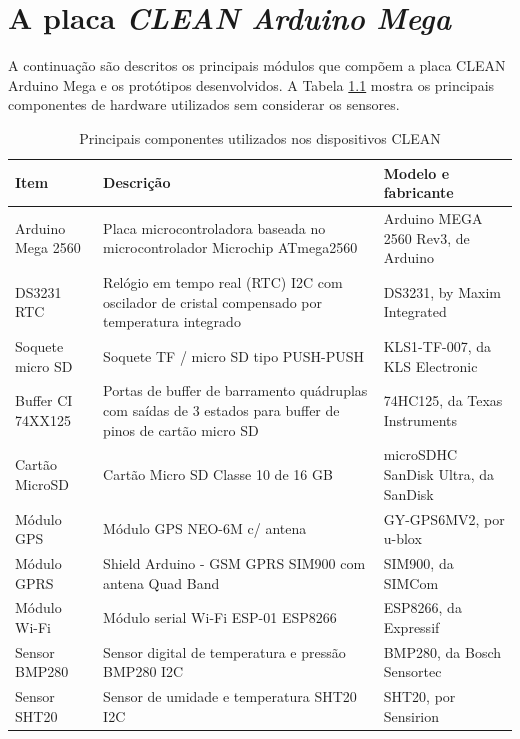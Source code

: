 \chapter{A placa \textit{CLEAN Arduino Mega}}\label{apendix: clean-arduino-mega-board}

A continuação são descritos os principais módulos que compõem a placa CLEAN Arduino Mega e os protótipos desenvolvidos. A Tabela \ref{tab:componentes-clean} mostra os principais componentes de hardware utilizados sem considerar os sensores.

\begin{table}
    \caption{Principais componentes utilizados nos dispositivos CLEAN}
    \label{tab:componentes-clean}
    \centering
    \begin{tabularx}{0.95\textwidth}[h]{
         >{\raggedright\arraybackslash}X
         >{\raggedright\arraybackslash}X 
         >{\raggedright\arraybackslash}X }
        \hline
        \textbf{Item} & \textbf{Descrição} & \textbf{Modelo e fabricante}\\ \hline
        Arduino Mega 2560 & Placa microcontroladora baseada no microcontrolador Microchip ATmega2560 & Arduino MEGA 2560 Rev3, de Arduino\\ \hline
		DS3231 RTC & Relógio em tempo real (RTC) I2C com oscilador de cristal compensado por temperatura integrado & DS3231, by Maxim Integrated\\ \hline
		Soquete micro SD & Soquete TF / micro SD tipo PUSH-PUSH & KLS1-TF-007, da KLS Electronic\\ \hline
        Buffer CI 74XX125 & Portas de buffer de barramento quádruplas com saídas de 3 estados para buffer de pinos de cartão micro SD & 74HC125, da Texas Instruments\\ \hline
        Cartão MicroSD & Cartão Micro SD Classe 10 de 16 GB & microSDHC SanDisk Ultra, da SanDisk\\ \hline
        Módulo GPS & Módulo GPS NEO-6M c/ antena & GY-GPS6MV2, por u-blox\\ \hline
        Módulo GPRS & Shield Arduino - GSM GPRS SIM900 com antena Quad Band & SIM900, da SIMCom\\ \hline
        Módulo Wi-Fi & Módulo serial Wi-Fi ESP-01 ESP8266 & ESP8266, da Expressif\\ \hline
        Sensor BMP280 & Sensor digital de temperatura e pressão BMP280 I2C & BMP280, da Bosch Sensortec\\ \hline
        Sensor SHT20 & Sensor de umidade e temperatura SHT20 I2C & SHT20, por Sensirion\\ \hline
    \end{tabularx}
\end{table}

